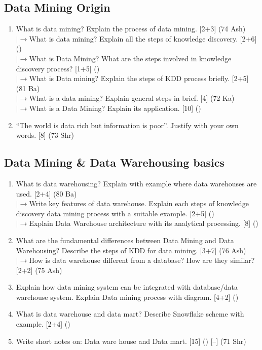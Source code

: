 \documentclass[12pt]{article}
\newcommand{\lb}{\\$\left|\rightarrow\right.$}
\begin{document}
  \subsection{Data Mining Origin}
    \begin{enumerate}[topsep=0pt, noitemsep]
      \item What is data mining? Explain the process of data mining. \hfill [2+3] (74 Ash)
        \lb What is data mining? Explain all the steps of knowledge discovery. \hfill [2+6] ()
        \lb What is Data Mining? What are the steps involved in knowledge discovery process? \hfill [1+5] ()
        \lb What is Data mining? Explain the steps of KDD process briefly. \hfill [2+5] (81 Ba)
        \lb What is a data mining? Explain general steps in brief. \hfill [4] (72 Ka)
        \lb What is a Data Mining? Explain its application. \hfill [10] ()

      \item ``The world is data rich but information is poor''. Justify with your own words. \hfill [8] (73 Shr)
    \end{enumerate}

  \subsection{Data Mining \& Data Warehousing basics}
    \begin{enumerate}[topsep=0pt, noitemsep]
      \item What is data warehousing? Explain with example where data warehouses are used. \hfill [2+4] (80 Ba)
        \lb Write key features of data warehouse. Explain each steps of knowledge discovery data mining process with a suitable example. \hfill [2+5] ()
        \lb Explain Data Warehouse architecture with its analytical processing. \hfill [8] ()

      \item What are the fundamental differences between Data Mining and Data Warehousing? Describe the steps of KDD for data mining. \hfill [3+7] (76 Ash)
        \lb How is data warehouse different from a database? How are they similar? \hfill [2+2] (75 Ash)

      \item Explain how data mining system can be integrated with database/data warehouse system. Explain Data mining process with diagram. \hfill [4+2] ()

      \item What is data warehouse and data mart? Describe Snowflake scheme with example. \hfill [2+4] ()

      \item Write short notes on: Data ware house and Data mart. \hfill [15] () [--] (71 Shr)
    \end{enumerate}
\end{document}
